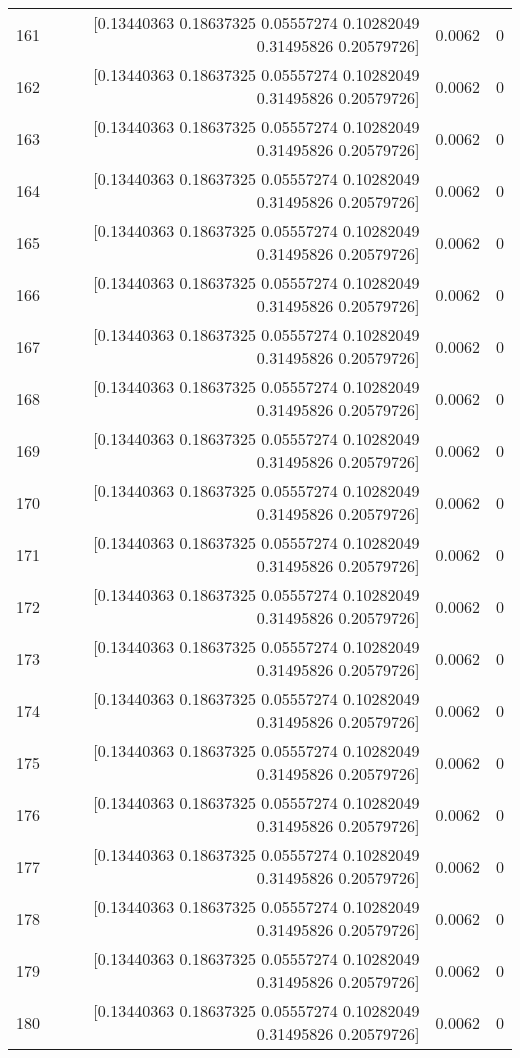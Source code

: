 \begin{longtable}{lrrr}
161 & [0.13440363 0.18637325 0.05557274 0.10282049 0.31495826 0.20579726] & 0.0062 & 0 \\
162 & [0.13440363 0.18637325 0.05557274 0.10282049 0.31495826 0.20579726] & 0.0062 & 0 \\
163 & [0.13440363 0.18637325 0.05557274 0.10282049 0.31495826 0.20579726] & 0.0062 & 0 \\
164 & [0.13440363 0.18637325 0.05557274 0.10282049 0.31495826 0.20579726] & 0.0062 & 0 \\
165 & [0.13440363 0.18637325 0.05557274 0.10282049 0.31495826 0.20579726] & 0.0062 & 0 \\
166 & [0.13440363 0.18637325 0.05557274 0.10282049 0.31495826 0.20579726] & 0.0062 & 0 \\
167 & [0.13440363 0.18637325 0.05557274 0.10282049 0.31495826 0.20579726] & 0.0062 & 0 \\
168 & [0.13440363 0.18637325 0.05557274 0.10282049 0.31495826 0.20579726] & 0.0062 & 0 \\
169 & [0.13440363 0.18637325 0.05557274 0.10282049 0.31495826 0.20579726] & 0.0062 & 0 \\
170 & [0.13440363 0.18637325 0.05557274 0.10282049 0.31495826 0.20579726] & 0.0062 & 0 \\
171 & [0.13440363 0.18637325 0.05557274 0.10282049 0.31495826 0.20579726] & 0.0062 & 0 \\
172 & [0.13440363 0.18637325 0.05557274 0.10282049 0.31495826 0.20579726] & 0.0062 & 0 \\
173 & [0.13440363 0.18637325 0.05557274 0.10282049 0.31495826 0.20579726] & 0.0062 & 0 \\
174 & [0.13440363 0.18637325 0.05557274 0.10282049 0.31495826 0.20579726] & 0.0062 & 0 \\
175 & [0.13440363 0.18637325 0.05557274 0.10282049 0.31495826 0.20579726] & 0.0062 & 0 \\
176 & [0.13440363 0.18637325 0.05557274 0.10282049 0.31495826 0.20579726] & 0.0062 & 0 \\
177 & [0.13440363 0.18637325 0.05557274 0.10282049 0.31495826 0.20579726] & 0.0062 & 0 \\
178 & [0.13440363 0.18637325 0.05557274 0.10282049 0.31495826 0.20579726] & 0.0062 & 0 \\
179 & [0.13440363 0.18637325 0.05557274 0.10282049 0.31495826 0.20579726] & 0.0062 & 0 \\
180 & [0.13440363 0.18637325 0.05557274 0.10282049 0.31495826 0.20579726] & 0.0062 & 0 \\

\end{longtable}
